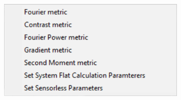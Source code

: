 \begin{figure}[H]
\begin{subfigure}{0.25\textwidth}
		\caption{}
		\label{fig:DM_methods_cockpit}
	\end{subfigure}
	\begin{subfigure}{0.5\textwidth}
		\centering
		\includegraphics[width=\linewidth]{images/DM_methods_cockpit_options.png}
		\caption{}
		\label{fig:DM_methods_cockpit_options}
	\end{subfigure}


\end{figure}
